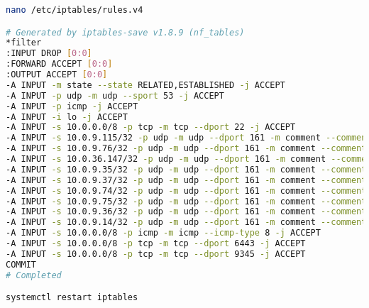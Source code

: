 \begin{lstlisting}[language=bash, caption=iptables entries server,captionpos=b,label={lst:iptables-server-entries},breaklines=true]
nano /etc/iptables/rules.v4

# Generated by iptables-save v1.8.9 (nf_tables)
*filter
:INPUT DROP [0:0]
:FORWARD ACCEPT [0:0]
:OUTPUT ACCEPT [0:0]
-A INPUT -m state --state RELATED,ESTABLISHED -j ACCEPT
-A INPUT -p udp -m udp --sport 53 -j ACCEPT
-A INPUT -p icmp -j ACCEPT
-A INPUT -i lo -j ACCEPT
-A INPUT -s 10.0.0.0/8 -p tcp -m tcp --dport 22 -j ACCEPT
-A INPUT -s 10.0.9.115/32 -p udp -m udp --dport 161 -m comment --comment "Allow SNMP for probe 10.0.9.115" -j ACCEPT
-A INPUT -s 10.0.9.76/32 -p udp -m udp --dport 161 -m comment --comment "Allow SNMP for probe 10.0.9.76" -j ACCEPT
-A INPUT -s 10.0.36.147/32 -p udp -m udp --dport 161 -m comment --comment "Allow SNMP for probe 10.0.36.147" -j ACCEPT
-A INPUT -s 10.0.9.35/32 -p udp -m udp --dport 161 -m comment --comment "Allow SNMP for probe 10.0.9.35" -j ACCEPT
-A INPUT -s 10.0.9.37/32 -p udp -m udp --dport 161 -m comment --comment "Allow SNMP for probe 10.0.9.37" -j ACCEPT
-A INPUT -s 10.0.9.74/32 -p udp -m udp --dport 161 -m comment --comment "Allow SNMP for probe 10.0.9.74" -j ACCEPT
-A INPUT -s 10.0.9.75/32 -p udp -m udp --dport 161 -m comment --comment "Allow SNMP for probe 10.0.9.75" -j ACCEPT
-A INPUT -s 10.0.9.36/32 -p udp -m udp --dport 161 -m comment --comment "Allow SNMP for probe 10.0.9.36" -j ACCEPT
-A INPUT -s 10.0.9.14/32 -p udp -m udp --dport 161 -m comment --comment "Allow SNMP for probe 10.0.9.14" -j ACCEPT
-A INPUT -s 10.0.0.0/8 -p icmp -m icmp --icmp-type 8 -j ACCEPT
-A INPUT -s 10.0.0.0/8 -p tcp -m tcp --dport 6443 -j ACCEPT
-A INPUT -s 10.0.0.0/8 -p tcp -m tcp --dport 9345 -j ACCEPT
COMMIT
# Completed

systemctl restart iptables
\end{lstlisting}
%
%

